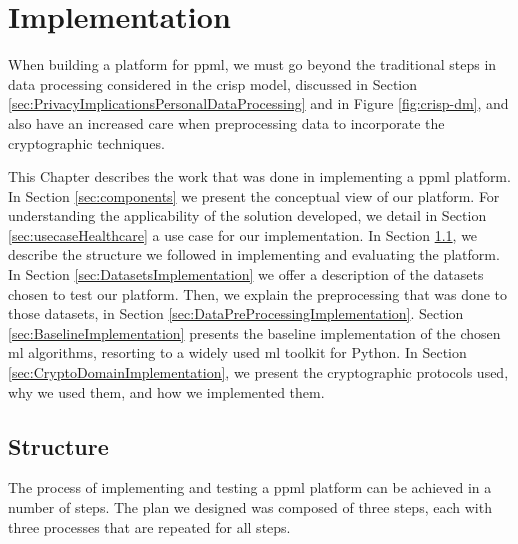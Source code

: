 %

\acresetall

\chapter{Implementation}
\label{ch:Implementation}

When building a platform for \ac{ppml}, we must go beyond the traditional steps in data processing considered in the \acs{crisp} model, discussed in Section \ref{sec:PrivacyImplicationsPersonalDataProcessing} and in Figure \ref{fig:crisp-dm}, and also have an increased care when preprocessing data to incorporate the cryptographic techniques.


This Chapter describes the work that was done in implementing a \ac{ppml} platform.
In Section \ref{sec:components} we present the conceptual view of our platform.
For understanding the applicability of the solution developed, we detail in Section \ref{sec:usecaseHealthcare} a use case for our implementation. 
In Section \ref{sec:StructureImplementation}, we describe the structure we followed in implementing and evaluating the platform.
In Section \ref{sec:DatasetsImplementation} we offer a description of the datasets chosen to test our platform. Then, we explain the preprocessing that was done to those datasets, in Section \ref{sec:DataPreProcessingImplementation}.
Section \ref{sec:BaselineImplementation} presents the baseline implementation of the chosen \ac{ml} algorithms, resorting to a widely used \ac{ml} toolkit for Python.
In Section \ref{sec:CryptoDomainImplementation}, we present the cryptographic protocols used, why we used them, and how we implemented them.









\section{Structure}
\label{sec:StructureImplementation}

The process of implementing and testing a \ac{ppml} platform can be achieved in a number of steps. The plan we designed was composed of three steps, each with three processes that are repeated for all steps.

